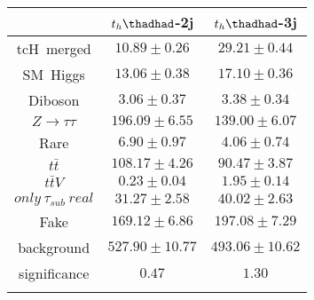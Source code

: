 \centering
\begin{tabular}{|ccc} \toprule\toprule
 & $t_{h}\thadhad$-2j & $t_{h}\thadhad$-3j\\\midrule
tcH~merged & $10.89\pm0.26$ & $29.21\pm0.44$\\
SM~Higgs & $13.06\pm0.38$ & $17.10\pm0.36$\\
Diboson & $3.06\pm0.37$ & $3.38\pm0.34$\\
$Z\to\tau\tau$ & $196.09\pm6.55$ & $139.00\pm6.07$\\
Rare & $6.90\pm0.97$ & $4.06\pm0.74$\\
$t\bar{t}$ & $108.17\pm4.26$ & $90.47\pm3.87$\\
$t\bar{t}V$ & $0.23\pm0.04$ & $1.95\pm0.14$\\
$only~\tau_{sub}~real$ & $31.27\pm2.58$ & $40.02\pm2.63$\\
Fake & $169.12\pm6.86$ & $197.08\pm7.29$\\
background & $527.90\pm10.77$ & $493.06\pm10.62$\\
significance & $0.47$ & $1.30$\\
\bottomrule\bottomrule\\
\end{tabular}
